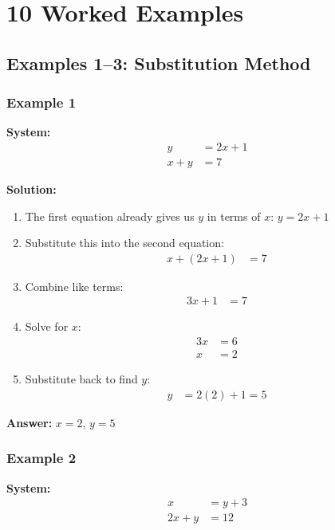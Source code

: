 \documentclass{article}
\begin{document}
\section{10 Worked Examples}

\subsection{Examples 1--3: Substitution Method}

\subsubsection{Example 1}

\textbf{System:}
\begin{align*}
y &= 2x + 1 \\
x + y &= 7
\end{align*}

\textbf{Solution:}

\begin{enumerate}
    \item The first equation already gives us $y$ in terms of $x$: $y = 2x + 1$
    \item Substitute this into the second equation:
    \begin{align*}
        x + (2x + 1) &= 7
    \end{align*}
    \item Combine like terms:
    \begin{align*}
        3x + 1 &= 7
    \end{align*}
    \item Solve for $x$:
    \begin{align*}
        3x &= 6 \\
        x &= 2
    \end{align*}
    \item Substitute back to find $y$:
    \begin{align*}
        y &= 2(2) + 1 = 5
    \end{align*}
\end{enumerate}

\textbf{Answer:} $x = 2, \, y = 5$ \,  

\subsubsection{Example 2}

\textbf{System:}
\begin{align*}
x &= y + 3 \\
2x + y &= 12
\end{align*}
\end{document}
